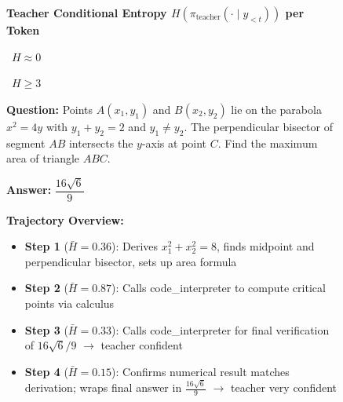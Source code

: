 \begin{figure}[p]  %
\centering



\begin{center}
\small
\textbf{Teacher Conditional Entropy $H(\pi_{\mathrm{teacher}}(\cdot \mid y_{<t}))$ per Token} \\[3pt]
\colorbox{green!80}{\strut\scriptsize~$H{\approx}0$~}%
\colorbox{green!40}{\strut\phantom{xx}}%
\colorbox{green!10}{\strut\phantom{xx}}%
\colorbox{yellow!30}{\strut\phantom{xx}}%
\colorbox{orange!50}{\strut\phantom{xx}}%
\colorbox{red!50}{\strut\phantom{xx}}%
\colorbox{red!80}{\strut\phantom{xx}}%
\colorbox{red!100}{\strut\scriptsize~$H{\geq}3$~}
\quad {\footnotesize \textcolor{green!60!black}{$\blacksquare$ Confident} \quad \textcolor{red!70!black}{$\blacksquare$ Unreliable}}
\end{center}
\vspace{4pt}

\begin{tcolorbox}[
  colframe=stableframe, colback=lightgreen,
  title={\textbf{Case A: Stable Trajectory} --- All tool calls succeed},
  fonttitle=\bfseries\small,
  coltitle=white, colbacktitle=stableframe,
  boxrule=1pt, arc=3pt,
  left=4pt, right=4pt, top=4pt, bottom=4pt
]

\noindent\textbf{Question:} {\small Points $A(x_1, y_1)$ and $B(x_2, y_2)$ lie on the parabola $x^2 = 4y$ with $y_1 + y_2 = 2$ and $y_1 \neq y_2$. The perpendicular bisector of segment $AB$ intersects the $y$-axis at point $C$. Find the maximum area of triangle $ABC$.}

\smallskip
\noindent\textbf{Answer:} $\boxed{\dfrac{16\sqrt{6}}{9}}$


\medskip
\noindent\textbf{Trajectory Overview:}
\begin{itemize}[leftmargin=*, nosep, itemsep=2pt]
\item \textbf{Step 1} ($\bar{H}{=}0.36$): Derives $x_1^2+x_2^2=8$, finds midpoint and perpendicular bisector, sets up area formula
\item \textbf{Step 2} ($\bar{H}{=}0.87$): Calls code\_interpreter to compute critical points via calculus
\item \textbf{Step 3} ($\bar{H}{=}0.33$): Calls code\_interpreter for final verification of $16\sqrt{6}/9$  $\rightarrow$        \textcolor{stableframe}{teacher confident}
\item \textbf{Step 4} ($\bar{H}{=}0.15$): Confirms numerical result matches derivation; wraps final answer in $\boxed{\frac{16\sqrt{6}}{9}}$ $\rightarrow$ \textcolor{stableframe}{teacher very confident}
\end{itemize}


\end{tcolorbox}
\end{figure}
